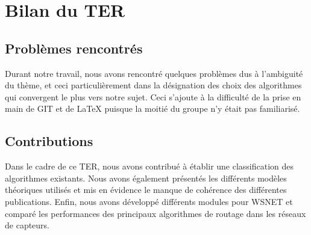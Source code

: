 \section{Bilan du TER}

\subsection{Problèmes rencontrés}
Durant notre travail, nous avons rencontré quelques problèmes dus à l'ambiguité du thème, et ceci particulièrement
dans la désignation des choix des algorithmes qui convergent le plus vers notre sujet. Ceci s'ajoute à la difficulté 
de la prise en main de GIT et de \LaTeX{} puisque la moitié du groupe n'y était pas familiarisé.

\subsection{Contributions}
Dans le cadre de ce TER, nous avons contribué à établir une classification des algorithmes existants. Nous avons également présentés les différents modèles théoriques utilisés et mis en évidence le manque de cohérence des différentes publications. Enfin, nous avons développé différents modules pour WSNET et comparé les performances des principaux algorithmes de routage dans les réseaux de capteurs.





